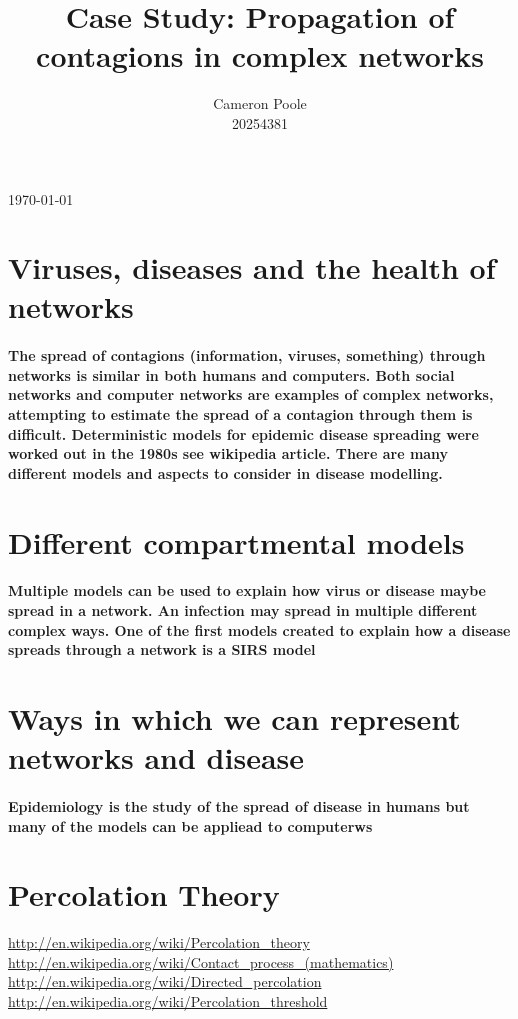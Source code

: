 \documentclass{article}
\begin{document}
\title{Case Study: Propagation of contagions in complex networks}
\author{Cameron Poole\\
	20254381}
\today
\maketitle

\section{Viruses, diseases and the health of networks}
\paragraph{
The spread of contagions (information, viruses, something) through networks is similar in both humans and computers.
Both social networks and computer networks are examples of complex networks, attempting to estimate the spread of a contagion through them is difficult. 
Deterministic models for epidemic disease spreading were worked out in the 1980s see wikipedia article.
There are many different models and aspects to consider in disease modelling. }

\section{Different compartmental models}
\paragraph{
Multiple models can be used to explain how virus or disease maybe spread in a network. 
An infection may spread in multiple different complex ways. One of the first models created to explain how a disease spreads through a network is a 
SIRS model}

\section{Ways in which we can represent networks and disease}
\paragraph{Epidemiology is the study of the spread of disease in humans but many of the models can be appliead to computerws}

\section{Percolation Theory}
\url{http://en.wikipedia.org/wiki/Percolation_theory }\\
\url{http://en.wikipedia.org/wiki/Contact_process_(mathematics)} \\
\url{http://en.wikipedia.org/wiki/Directed_percolation}\\
\url{http://en.wikipedia.org/wiki/Percolation_threshold}\\
\end{document}
